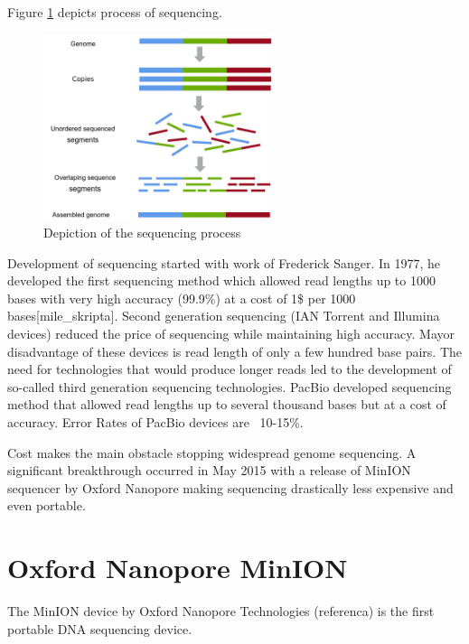 \documentclass[times, utf8, diplomski, numeric, english]{fer}
\begin{document}
Figure \ref{fg:sequencing} depicts process of sequencing.

\begin{figure}[!ht]
	\begin{center}
		\includegraphics[width=0.6\textwidth]{./imgs/sequencing.png}
		\caption{Depiction of the sequencing process}
		\label{fg:sequencing}
	\end{center}
\end{figure}


Development of sequencing started with work of Frederick Sanger\cite{mile}\cite{Pettersson2009}. In 1977, he developed the first sequencing method which allowed 
read lengths up to 1000 bases with very high accuracy (99.9\%) at a cost of 1\$ per 1000 bases[mile\_skripta].
Second generation sequencing (IAN Torrent and Illumina devices) reduced the price of sequencing while maintaining high accuracy. Mayor disadvantage of these devices is read length of only a few hundred base pairs.
The need for technologies that would produce longer reads led to the development of so-called third generation sequencing technologies.
PacBio developed sequencing method that allowed read lengths up to several thousand bases but at a cost of accuracy. Error Rates of PacBio devices are ~10-15\%. 

Cost makes the main obstacle stopping widespread genome sequencing.
A significant breakthrough occurred in May 2015 with a release of MinION sequencer by Oxford Nanopore making sequencing drastically less expensive and even portable.


\section{Oxford Nanopore MinION}


The MinION device by Oxford Nanopore Technologies (referenca) is the first portable DNA sequencing device.
\end{document}
